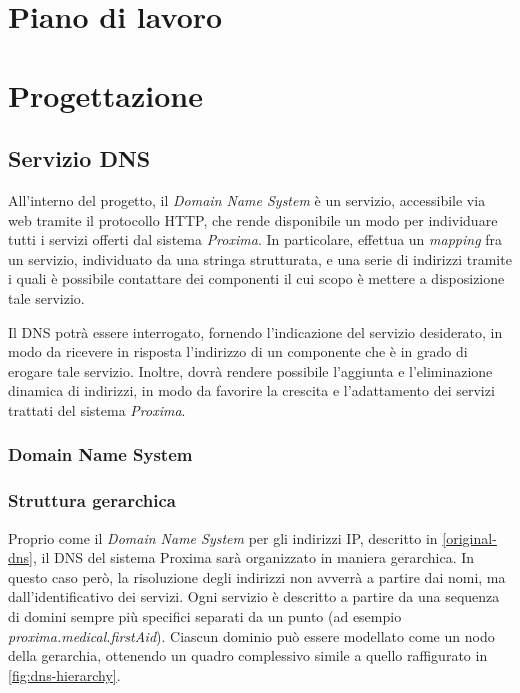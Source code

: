\documentclass[a4paper,12pt]{report}
\begin{document}
\chapter{Piano di lavoro}

\chapter{Progettazione}

\section{Servizio DNS}
All'interno del progetto, il \emph{Domain Name System} è un servizio, accessibile via web tramite il protocollo HTTP, che rende disponibile un modo per individuare tutti i servizi offerti dal sistema \emph{Proxima}. In particolare, effettua un \emph{mapping} fra un servizio, individuato da una stringa strutturata, e una serie di indirizzi tramite i quali è possibile contattare dei componenti il cui scopo è mettere a disposizione tale servizio. 

Il DNS potrà essere interrogato, fornendo l'indicazione del servizio desiderato, in modo da ricevere in risposta l'indirizzo di un componente che è in grado di erogare tale servizio. Inoltre, dovrà rendere possibile l'aggiunta e l'eliminazione dinamica di indirizzi, in modo da favorire la crescita e l'adattamento dei servizi trattati del sistema \emph{Proxima}.

\subsection{Domain Name System} \label{original-dns}

\subsection{Struttura gerarchica}
Proprio come il \emph{Domain Name System} per gli indirizzi IP, descritto in \autoref{original-dns}, il DNS del sistema Proxima sarà organizzato in maniera gerarchica. In questo caso però, la risoluzione degli indirizzi non avverrà a partire dai nomi, ma dall'identificativo dei servizi. Ogni servizio è descritto a partire da una sequenza di domini sempre più specifici separati da un punto (ad esempio \emph{proxima.medical.firstAid}). Ciascun dominio può essere modellato come un nodo della gerarchia, ottenendo un quadro complessivo simile a quello raffigurato in \autoref{fig:dns-hierarchy}.
\end{document}
